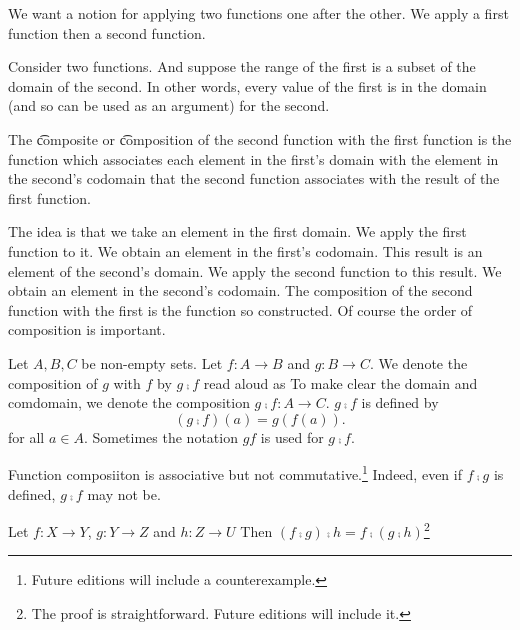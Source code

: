 

We want a notion for applying two functions one after the other.
We apply a first function then a second function.


Consider two functions.
And suppose the range of the first is a subset of the domain of the second.
In other words, every value of the first is in the domain (and so can be used as an argument) for the second.

The \t{composite} or \t{composition} of the second function with the first function is the function which associates each element in the first's domain with the element in the second's codomain that the second function associates with the result of the first function.

The idea is that we take an element in the first domain.
We apply the first function to it.
We obtain an element in the first's codomain.
This result is an element of the second's domain.
We apply the second function to this result.
We obtain an element in the second's codomain.
The composition of the second function with the first is the function so constructed.
Of course the order of composition is important.


Let $A, B, C$ be non-empty sets.
Let $f: A \to B$ and $g: B \to C$.
We denote the composition of $g$ with $f$ by $g \comp f$ read aloud as 
To make clear the domain and comdomain, we denote the composition $g \comp f: A \to C$.
$g \comp f$ is defined by
\[
  (g \comp f)(a) = g(f(a)).
\]
for all $a \in A$.
Sometimes the notation $gf$ is used for $g \comp f$.



Function composiiton is associative but not commutative.\footnote{Future editions will include a counterexample.}
Indeed, even if $f \comp g$ is defined, $g \comp f$ may not be.

\begin{proposition}[Associative]
Let $f: X \to Y$, $g: Y \to Z$ and $h: Z \to U$
Then $(f \comp g) \comp h = f \comp (g \comp h)$\footnote{The proof is straightforward. Future editions will include it.}
\end{proposition}
